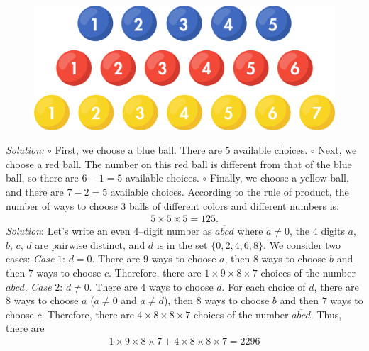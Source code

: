 \begin{multicols}{2}
	\begin{figure}[H]
		\centering
		\vspace*{-5pt}
		\captionsetup{labelformat= empty, justification=centering}
		\includegraphics[width=1\linewidth]{bong}
		\vspace*{-5pt}
	\end{figure}
	\textit{Solution:}
	\vskip 0.1cm 
	$\circ$ First, we choose a {\color{blue}blue ball}. There are $5$ available choices. 
	\vskip 0.1cm
	$\circ$ Next, we choose a {\color{red}red ball}. The number on this {\color{red}red ball} is different from that of the {\color{blue}blue ball}, so there are $6-1=5$ available choices. 
	\vskip 0.1cm
	$\circ$ Finally, we choose a {\color{amber}yellow ball}, and there are $7-2=5$ available choices. 
	\vskip 0.1cm
	According to the rule of product, the number of ways to choose $3$ balls of different colors and different numbers is: 
	\begin{align*}
		5\times5\times5=125.
	\end{align*}
	\vskip 0.1cm
	\textit{Solution}:  Let’s write an even $4$--digit number as $\overline{abcd}$ where $a\ne 0$, the $4$ digits $a$, $b$, $c$, $d$ are pairwise distinct, and $d$ is in the set $\{0,2,4,6,8\}$.
	\vskip 0.1cm
	We consider two cases:
	\vskip 0.1cm
	\textit{Case} $1$: $d=0$. There are $9$ ways to choose $a$, then $8$ ways to choose $b$ and then $7$ ways to choose $c$. Therefore, there are $1\times 9\times8\times7$ choices of the number $\overline{abcd}$.
	\vskip 0.1cm
	\textit{Case} $2$: $d\ne0$. There are $4$ ways to choose $d$. For each choice of $d$, there are $8$ ways to choose $a$ ($a\ne0$ and $a\ne d$), then $8$ ways to choose $b$ and then $7$ ways to choose $c$. Therefore, there are $4
	\times8\times8\times7$ choices of the number $\overline{abcd}$.
	\vskip 0.1cm
	Thus, there are 
	\begin{align*}
		1\times9\times8\times7+4\times8\times8\times7 = 2296

\end{align*}
\end{multicols}
